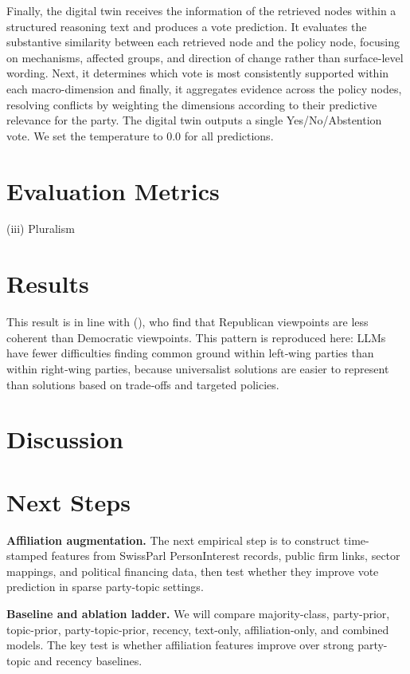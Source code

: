 \documentclass[letterpaper]{article}
\begin{document}
Finally, the digital twin receives the information of the retrieved nodes within a structured reasoning text and produces a vote prediction. It evaluates the substantive similarity between each retrieved node and the policy node, focusing on mechanisms, affected groups, and direction of change rather than surface-level wording. Next, it determines which vote is most consistently supported within each macro-dimension and finally, it aggregates evidence across the policy nodes, resolving conflicts by weighting the dimensions according to their predictive relevance for the party. The digital twin outputs a single Yes/No/Abstention vote. We set the temperature to 0.0 for all predictions.


\section{Evaluation Metrics}


(iii) Pluralism

\section{Results}

This result is in line with \citeauthor{luders2024attitude} (\citeyear{luders2024attitude}), who find that Republican viewpoints are less coherent than Democratic viewpoints. This pattern is reproduced here: LLMs have fewer difficulties finding common ground within left‑wing parties than within right‑wing parties, because universalist solutions are easier to represent than solutions based on trade‑offs and targeted policies.


\section{Discussion}



\section{Next Steps}

\textbf{Affiliation augmentation.} The next empirical step is to construct time-stamped features from SwissParl PersonInterest records, public firm links, sector mappings, and political financing data, then test whether they improve vote prediction in sparse party-topic settings.

\textbf{Baseline and ablation ladder.} We will compare majority-class, party-prior, topic-prior, party-topic-prior, recency, text-only, affiliation-only, and combined models. The key test is whether affiliation features improve over strong party-topic and recency baselines.
\end{document}
